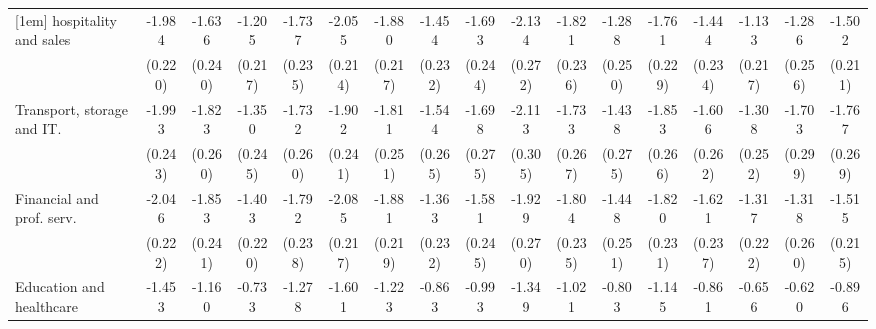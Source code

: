 {\begin{tabular}{l*{16}{c}}
[1em]
hospitality and sales&      -1.984\sym{***}&      -1.636\sym{***}&      -1.205\sym{***}&      -1.737\sym{***}&      -2.055\sym{***}&      -1.880\sym{***}&      -1.454\sym{***}&      -1.693\sym{***}&      -2.134\sym{***}&      -1.821\sym{***}&      -1.288\sym{***}&      -1.761\sym{***}&      -1.444\sym{***}&      -1.133\sym{***}&      -1.286\sym{***}&      -1.502\sym{***}\\
                    &     (0.220)         &     (0.240)         &     (0.217)         &     (0.235)         &     (0.214)         &     (0.217)         &     (0.232)         &     (0.244)         &     (0.272)         &     (0.236)         &     (0.250)         &     (0.229)         &     (0.234)         &     (0.217)         &     (0.256)         &     (0.211)         \\
[1em]
Transport, storage and IT.&      -1.993\sym{***}&      -1.823\sym{***}&      -1.350\sym{***}&      -1.732\sym{***}&      -1.902\sym{***}&      -1.811\sym{***}&      -1.544\sym{***}&      -1.698\sym{***}&      -2.113\sym{***}&      -1.733\sym{***}&      -1.438\sym{***}&      -1.853\sym{***}&      -1.606\sym{***}&      -1.308\sym{***}&      -1.703\sym{***}&      -1.767\sym{***}\\
                    &     (0.243)         &     (0.260)         &     (0.245)         &     (0.260)         &     (0.241)         &     (0.251)         &     (0.265)         &     (0.275)         &     (0.305)         &     (0.267)         &     (0.275)         &     (0.266)         &     (0.262)         &     (0.252)         &     (0.299)         &     (0.269)         \\
[1em]
Financial and prof. serv.&      -2.046\sym{***}&      -1.853\sym{***}&      -1.403\sym{***}&      -1.792\sym{***}&      -2.085\sym{***}&      -1.881\sym{***}&      -1.363\sym{***}&      -1.581\sym{***}&      -1.929\sym{***}&      -1.804\sym{***}&      -1.448\sym{***}&      -1.820\sym{***}&      -1.621\sym{***}&      -1.317\sym{***}&      -1.318\sym{***}&      -1.515\sym{***}\\
                    &     (0.222)         &     (0.241)         &     (0.220)         &     (0.238)         &     (0.217)         &     (0.219)         &     (0.232)         &     (0.245)         &     (0.270)         &     (0.235)         &     (0.251)         &     (0.231)         &     (0.237)         &     (0.222)         &     (0.260)         &     (0.215)         \\
[1em]
Education and healthcare&      -1.453\sym{***}&      -1.160\sym{***}&      -0.733\sym{***}&      -1.278\sym{***}&      -1.601\sym{***}&      -1.223\sym{***}&      -0.863\sym{***}&      -0.993\sym{***}&      -1.349\sym{***}&      -1.021\sym{***}&      -0.803\sym{**} &      -1.145\sym{***}&      -0.861\sym{***}&      -0.656\sym{**} &      -0.620\sym{*}  &      -0.896\sym{***}\\

\end{tabular}}
